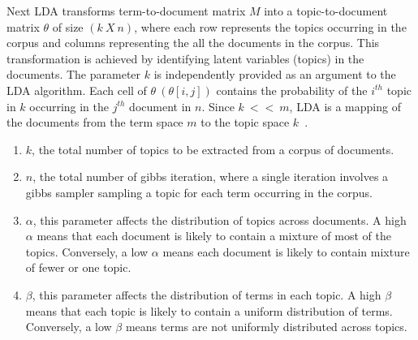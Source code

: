 Next LDA transforms term-to-document matrix $M$ into a topic-to-document matrix $\theta$ of size $(k\ X\ n)$,
where each row represents the topics occurring in the corpus and columns representing the all the documents in the corpus. 
This transformation is achieved by identifying latent variables (topics) in the documents. 
The parameter $k$ is independently provided as an argument to the LDA algorithm.
Each cell of $\theta\ (\theta[i,j])$ contains the probability of the $i^{th}$ topic in $k$ occurring in the $j^{th}$ document in $n$. Since $k\ <<\ m$, LDA is a mapping of the documents from the term space $m$ to the topic space $k$~\cite{panichella2013effectively}.


\begin{enumerate}
	\item $k$, the total number of topics to be extracted from a corpus of documents.
	\item $n$, the total number of gibbs iteration, where a single iteration involves a gibbs sampler sampling a topic for each term occurring in the corpus.
	\item $\alpha$, this parameter affects the distribution of topics across documents. A high $\alpha$ means that each document is likely to contain a mixture of most of the topics. Conversely, a low $\alpha$ means each document is likely to contain mixture of fewer or one topic. 
	\item $\beta$, this parameter affects the distribution of terms in each topic. A high $\beta$ means that each topic is likely to contain a uniform distribution of terms. Conversely, a low $\beta$ means terms are not uniformly distributed across topics. 
	
\end{enumerate}